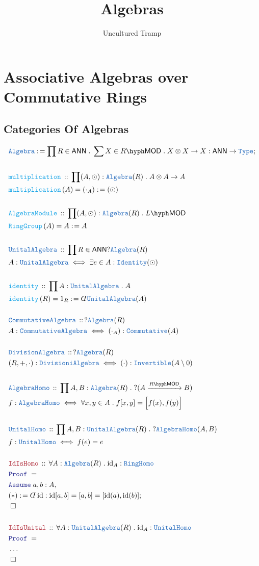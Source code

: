 \documentclass[12pt]{scrartcl}%
\title{Algebras}
\author{Uncultured Tramp}
\newcommand{\TYPE}[1]{\textcolor{NavyBlue}{\mathtt{#1}}}%
\newcommand{\FUNC}[1]{\textcolor{Cerulean}{\mathtt{#1}}}%
\newcommand{\LOGIC}[1]{\textcolor{Blue}{\mathtt{#1}}}%
\newcommand{\THM}[1]{\textcolor{Maroon}{\mathtt{#1}}}%
\renewcommand{\.}{\; . \;} %
\newcommand{\de}{: \kern 0.1pc =} %
\newcommand{\Act}[1]{\left( #1 \right)} %
\newcommand{\Theorem}[2]{& \THM{#1} \, :: \, #2 \\ & \Proof = \\ } %
\newcommand{\DeclareType}[2]{& \TYPE{#1} \, :: \, #2 \\}%
\newcommand{\DefineType}[3]{& #1 : \TYPE{#2} \iff #3 \\}%
\newcommand{\DeclareFunc}[2]{& \FUNC{#1} \, :: \, #2 \\}%
\newcommand{\DefineNamedFunc}[4]{&  \FUNC{#1}\Act{#2} = #3 \de #4 \\}%
\newcommand{\Page}[1]{ \begin{align*} #1 \end{align*}  }%
\newcommand{ \bd }{ \ByDef }%
\newcommand{\NoProof}{ & \ldots \\ \EndProof}%
\newcommand{\Type}{\TYPE{Type}}%
\DeclareMathOperator*{\id}{id}%
\newcommand{\Conclude}[3]{& #1 \de #2 : #3; \\}%
\newcommand{\Assume}[2]{& \LOGIC{Assume} \; #1 : #2, \\} %
\newcommand{\QED}{\; \square} %
\newcommand{\EndProof}{& \QED \\} %
\newcommand{\ByDef}{\rotatebox[origin=c]{-180}{$D$}}%
\newcommand{\Proof}{\LOGIC{Proof} \; } %
\newcommand{\Arrow}[1]{\xrightarrow{#1}}%
\newcommand{\LMOD}[1]{#1\hyph\mathsf{MOD}} %
\newcommand{\ANN}{\mathsf{ANN}} %
\newcommand{\Algebra}{\TYPE{Algebra}}
\begin{document}
\maketitle
\normalsize
\newpage
\tableofcontents
\newpage
\section{Associative Algebras over Commutative Rings}
\subsection{Categories Of Algebras}
\Page{
	\Conclude{\Algebra}{ \prod R \in \ANN  \.   \sum X \in \LMOD{R} \. X \otimes X \to X  }{\ANN \to \Type}
	\\
	\DeclareFunc{multiplication}{\prod (A,\odot) : \Algebra(R) \. A \otimes A \to A}
	\DefineNamedFunc{multiplication}{A}{(\cdot_A)}{(\odot)}
	\\	
	\DeclareFunc{AlgebraModule}{\prod (A,\odot) : \Algebra(R) \. \LMOD{L}}
	\DefineNamedFunc{RingGroup}{A}{A}{A}
	\\
	\DeclareType{UnitalAlgebra}{ \prod R \in \ANN  ? \Algebra(R)  }
	\DefineType{A}{UnitalAlgebra}{ \exists e \in A : \TYPE{Identity}(\odot)   }
	\\
	\DeclareFunc{identity}{\prod A : \TYPE{UnitalAlgebra} \. A}
	\DefineNamedFunc{identity}{R}{1_R}{ \bd \TYPE{UnitalAlgebra}(A) }
	\\
	\DeclareType{CommutativeAlgebra}{?\Algebra(R)}
	\DefineType{A}{CommutativeAlgebra}{(\cdot_A) : \TYPE{Commutative}(A)}
	\\
	\DeclareType{DivisionAlgebra}{?\Algebra(R)}
	\DefineType{(R,+,\cdot)}{DivisioniAlgebra}{(\cdot) : \TYPE{Invertible}(A \setminus 0)}
	\\
	\DeclareType{AlgebraHomo}{\prod A,B : \Algebra(R) \.  ?(A \Arrow{\LMOD{R}} B)}
	\DefineType{f}{AlgebraHomo}{\forall x,y \in A \. f[x,y] = \Big[f(x),f(y)\Big]}  
	\\
	\DeclareType{UnitalHomo}{\prod A,B : \TYPE{UnitalAlgebra}(R) \. ?\TYPE{AlgebraHomo}(A,B)}
	\DefineType{f}{UnitalHomo}{f(e) = e}  
	\\
	\Theorem{IdIsHomo}{\forall A : \Algebra(R) \. {\id}_{A} : \TYPE{RingHomo}}
	\Assume{a,b}{A}
	\Conclude{(*)}{ \bd \id   }{  \id[a,b] = [a,b]  = [\id(a),\id(b)] }
	\EndProof
	\\
	\Theorem{IdIsUnital}{\forall A : \TYPE{UnitalAlgebra}(R) \. {\id}_{A} : \TYPE{UnitalHomo}}
	\NoProof
}
\end{document}

